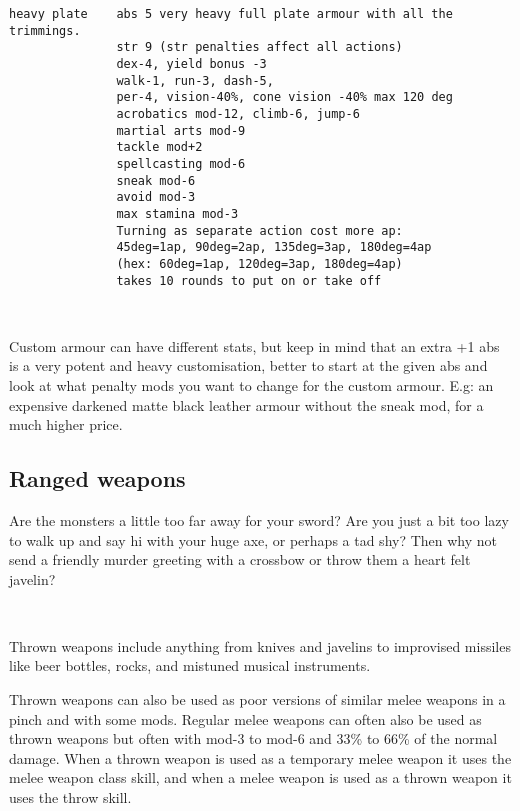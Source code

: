 \begin{samepage}
\begin{verbatim}
heavy plate    abs 5 very heavy full plate armour with all the trimmings.
               str 9 (str penalties affect all actions)
               dex-4, yield bonus -3
               walk-1, run-3, dash-5,
               per-4, vision-40%, cone vision -40% max 120 deg
               acrobatics mod-12, climb-6, jump-6
               martial arts mod-9
               tackle mod+2
               spellcasting mod-6
               sneak mod-6
               avoid mod-3
               max stamina mod-3
               Turning as separate action cost more ap:
               45deg=1ap, 90deg=2ap, 135deg=3ap, 180deg=4ap
               (hex: 60deg=1ap, 120deg=3ap, 180deg=4ap)
               takes 10 rounds to put on or take off
\end{verbatim} \end{samepage} \normalsize \goodbreak

\

Custom armour can have different stats, but keep in mind that an extra +1 abs is a very potent and heavy customisation, better to start at the given abs and look at what penalty mods you want to change for the custom armour. E.g: an expensive darkened matte black leather armour without the sneak mod, for a much higher price.


\subsection*{Ranged weapons}
Are the monsters a little too far away for your sword? Are you just a bit too lazy to walk up and say hi with your huge axe, or perhaps a tad shy? Then why not send a friendly murder greeting with a crossbow or throw them a heart felt javelin?

\

\noindent Thrown weapons include anything from knives and javelins to improvised missiles like beer bottles, rocks, and mistuned musical instruments.

Thrown weapons can also be used as poor versions of similar melee weapons in a pinch and with some mods. Regular melee weapons can often also be used as thrown weapons but often with mod-3 to mod-6 and 33\% to 66\% of the normal damage. When a thrown weapon is used as a temporary melee weapon it uses the melee weapon class skill, and when a melee weapon is used as a thrown weapon it uses the throw skill.

\


